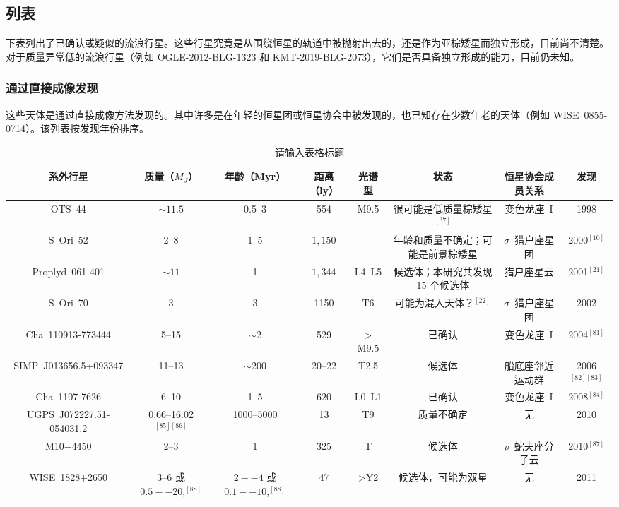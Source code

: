 \subsection{列表}
下表列出了已确认或疑似的流浪行星。这些行星究竟是从围绕恒星的轨道中被抛射出去的，还是作为亚棕矮星而独立形成，目前尚不清楚。对于质量异常低的流浪行星（例如 OGLE-2012-BLG-1323 和 KMT-2019-BLG-2073），它们是否具备独立形成的能力，目前仍未知。
\subsubsection{通过直接成像发现}
这些天体是通过直接成像方法发现的。其中许多是在年轻的恒星团或恒星协会中被发现的，也已知存在少数年老的天体（例如 WISE~0855-0714）。该列表按发现年份排序。

\begin{table}[ht]
\centering
\caption{请输入表格标题}\label{tab_RoPl1}
\begin{tabular}{|c|c|c|c|c|c|c|c|}
\hline
系外行星 & 质量（$M_J$）& 年龄（Myr）& 距离（ly）& 光谱型 & 状态 & 恒星协会成员关系 & 发现\\
\hline
OTS~44 & $\sim11.5$ & 0.5--3 & 554 & M9.5 & 很可能是低质量棕矮星$^{[37]}$ & 变色龙座~I & 1998\\
\hline
S~Ori~52 & 2--8 & 1--5 & $1{,}150$  &  & 年龄和质量不确定；可能是前景棕矮星 & $\sigma$~猎户座星团 & 2000$^{[10]}$\\
\hline
Proplyd~061-401 & $\sim11$ & 1 & $1{,}344$ & L4--L5 & 候选体；本研究共发现 15 个候选体 & 猎户座星云 & 2001$^{[21]}$\\
\hline
S~Ori~70 & 3 & 3 & 1150 & T6 & 可能为混入天体？$^{[22]}$ & $\sigma$~猎户座星团 & 2002\\
\hline
Cha~110913-773444 & 5--15 & $\sim2$ & 529 & $>$M9.5 & 已确认 & 变色龙座~I & 2004$^{[81]}$\\
\hline
SIMP~J013656.5+093347 & 11--13 & $\sim200$ & 20--22 & T2.5 & 候选体 & 船底座邻近运动群 & 2006$^{[82][83]}$\\
\hline
Cha~1107-7626 & 6--10 & 1--5 & $620$ & L0--L1 & 已确认 & 变色龙座~I & 2008$^{[84]}$\\
\hline
UGPS~J072227.51-054031.2 & 0.66--16.02$^{[85][86]}$ & 1000--5000& 13 & T9 & 质量不确定 & 无 & 2010\\
\hline
M10$-$4450 & 2--3 & 1 & 325 & T & 候选体 & $\rho$~蛇夫座分子云 & 2010$^{[87]}$\\
\hline
WISE~1828+2650 & 3--6 或 $0.5--20$,$^{[88]}$ & $2--4$ 或 $0.1--10$,$^{[88]}$ & 47 & >Y2 & 候选体，可能为双星 & 无 & 2011\\

\end{tabular}
\end{table}
